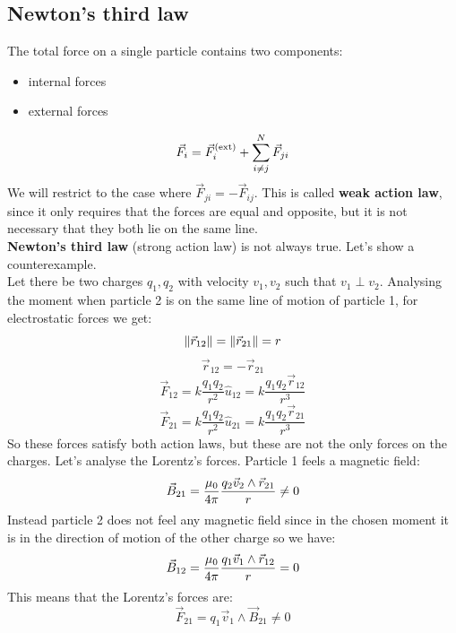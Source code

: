 \subsection{Newton's third law}
The total force on a single particle contains two components:
\begin{itemize}
    \item internal forces
    \item external forces
\end{itemize}
\begin{equation}
    \vec{F}_i = \vec{F}_i^{(\mathrm{ext})} + \displaystyle\sum_{i\neq j}^{N}\vec{F}_{ji}
\end{equation}
We will restrict to the case where $\vec{F}_{ji} = -\vec{F}_{ij}$. This is called \textbf{weak action law}, since it only requires that the forces are equal and opposite, but it is not necessary that they both lie on the same line.\\
\textbf{Newton's third law} (strong action law) is not always true. Let's show a counterexample.\\
Let there be two charges $q_1,q_2$ with velocity $v_1,v_2$ such that $v_1\perp v_2$. Analysing the moment when particle 2 is on the same line of motion of particle 1, for electrostatic forces we get:
\[\norm{\vec{r}_{12}} = \norm{\vec{r}_{21}} = r\]
\[\vec{r}_{12} = - \vec{r}_{21}\]
\begin{equation}
    \vec{F}_{12} = k\dfrac{q_1q_2}{r^2}\hat{u}_{12} = k\dfrac{q_1q_2 \vec{r}_{12}}{r^3}
\end{equation}
\begin{equation}
    \vec{F}_{21} = k\dfrac{q_1q_2}{r^2}\hat{u}_{21} = k\dfrac{q_1q_2 \vec{r}_{21}}{r^3}
\end{equation}
So these forces satisfy both action laws, but these are not the only forces on the charges. Let's analyse the Lorentz's forces. Particle 1 feels a magnetic field:
\begin{equation}
    \vec{B}_{21} = \dfrac{\mu_0}{4\pi}\dfrac{q_2\vec{v}_2\wedge\vec{r}_{21}}{r} \neq 0
\end{equation}
Instead particle 2 does not feel any magnetic field since in the chosen moment it is in the direction of motion of the other charge so we have:
\begin{equation}
    \vec{B}_{12} = \dfrac{\mu_0}{4\pi}\dfrac{q_1\vec{v}_1\wedge\vec{r}_{12}}{r} = 0
\end{equation}
This means that the Lorentz's forces are:
\begin{equation}
    \vec{F}_{21} = q_1\vec{v}_1\wedge\vec{B}_{21} \neq 0
\end{equation}

